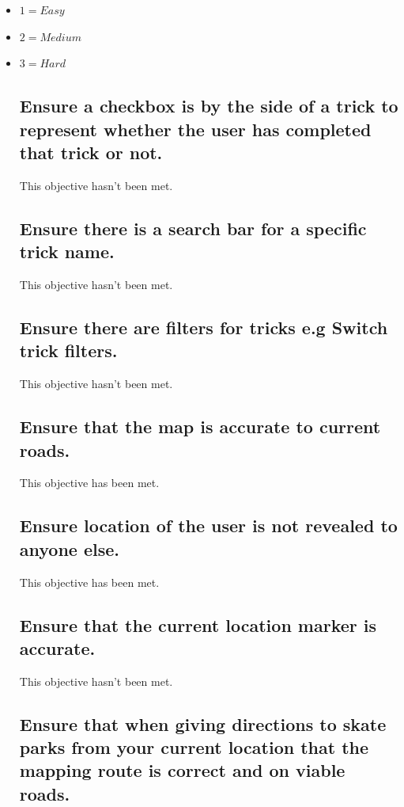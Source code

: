 \begin{itemize}
\item $1 = Easy$
\item $2 = Medium$
\item $3 = Hard$

\subsection {Ensure a checkbox is by the side of a trick to represent whether the user has completed that trick or not.}

This objective hasn't been met.

\subsection {Ensure there is a search bar for a specific trick name.}

This objective hasn't been met.

\subsection {Ensure there are filters for tricks e.g Switch trick filters.}

This objective hasn't been met.



\subsection {Ensure that the map is accurate to current roads.}

This objective has been met.

\subsection {Ensure location of the user is not revealed to anyone else.}

This objective has been met.

\subsection {Ensure that the current location marker is accurate.}

This objective hasn't been met.

\subsection {Ensure that when giving directions to skate parks from your current location that the mapping route is correct and on viable roads. }


\end{itemize}

